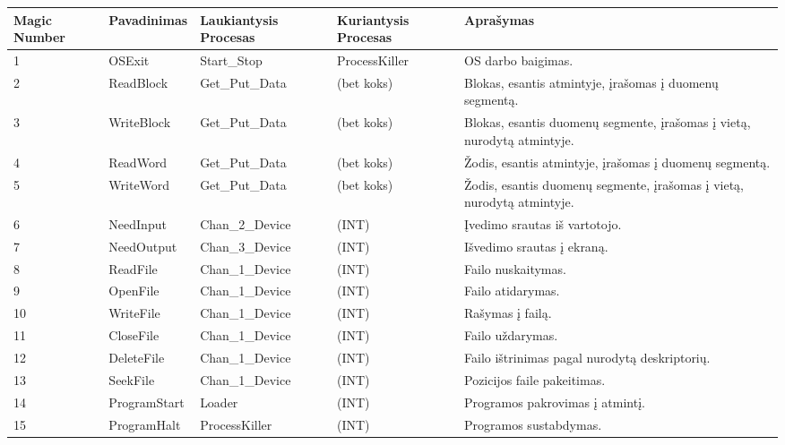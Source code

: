 		\begin{tabular}{| p{} |*{3} {p{} |} p{5cm}|}
			\hline
			Magic Number	& Pavadinimas	& Laukiantysis Procesas	& Kuriantysis Procesas	& Aprašymas\\
			\hline
			1 				& OSExit		& Start\_Stop			& ProcessKiller			& OS darbo baigimas.\\
			\hline
			2				& ReadBlock		& Get\_Put\_Data		& (bet koks)			& Blokas, esantis atmintyje, įrašomas į duomenų segmentą.\\
			\hline
			3				& WriteBlock	& Get\_Put\_Data		& (bet koks)			& Blokas, esantis duomenų segmente, įrašomas į  vietą, nurodytą atmintyje.\\
			\hline
			4				& ReadWord		& Get\_Put\_Data		& (bet koks)			& Žodis, esantis atmintyje, įrašomas į duomenų segmentą.\\	
			\hline
			5				& WriteWord		& Get\_Put\_Data		& (bet koks)			& Žodis, esantis duomenų segmente, įrašomas į vietą, nurodytą atmintyje.\\
			\hline
			6				& NeedInput		& Chan\_2\_Device		& (INT)					& Įvedimo srautas iš vartotojo.\\
			\hline
			7				& NeedOutput	& Chan\_3\_Device		& (INT)					& Išvedimo srautas į ekraną.\\
			\hline
			8				& ReadFile		& Chan\_1\_Device		& (INT)					& Failo nuskaitymas.\\
			\hline
			9				& OpenFile		& Chan\_1\_Device		& (INT)					& Failo atidarymas.\\
			\hline
			10				& WriteFile		& Chan\_1\_Device		& (INT)					& Rašymas į failą.\\
			\hline
			11				& CloseFile		& Chan\_1\_Device		& (INT)					& Failo uždarymas.\\
			\hline
			12				& DeleteFile	& Chan\_1\_Device		& (INT)					& Failo ištrinimas pagal nurodytą deskriptorių.\\
			\hline
			13				& SeekFile		& Chan\_1\_Device		& (INT)					& Pozicijos faile pakeitimas.\\
			\hline
			14				& ProgramStart	& Loader				& (INT)					& Programos pakrovimas į atmintį.\\
			\hline
			15				& ProgramHalt	& ProcessKiller			& (INT)					& Programos sustabdymas.\\
			\hline
			
		\end{tabular}
		
